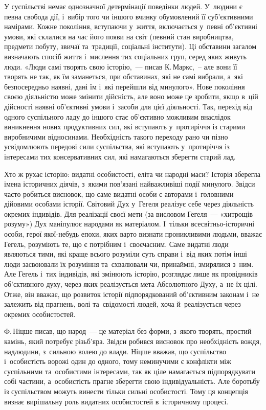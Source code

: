 \documentclass[a5paper,oneside,DIV=12,12pt,headings=small]{scrartcl}
\begin{document}
		У суспільстві немає однозначної детермінації поведінки людей. У~людини є певна свобода дії, і~вибір того чи іншого вчинку обумовлений її суб'\-єктивними намірами. Кожне покоління, вступаючи у~життя, включається у~певні об'\-єктивні умови, які склалися на час його появи на світ (певний стан виробництва, предмети побуту, звичаї та~традиції, соціальні інститути). Ці обставини загалом визначають спосіб життя і~мислення тих соціальних груп, серед яких живуть люди. «Люди самі творять свою історію,~— писав К.\,Маркс,~– але вони її творять не так, як їм заманеться, при обставинах, які не самі вибрали, а~які безпосередньо наявні, дані їм і~які перейшли від минулого». Нове покоління своєю діяльністю може змінити дійсність, але воно може це зробити, якщо в~цій дійсності наявні об'\-єктивні умови і~засоби для цієї діяльності. Так, перехід від одного суспільного ладу до іншого стає об'\-єктивно можливим внаслідок виникнення нових продуктивних сил, які вступають у~протиріччя із старими виробничими відносинами. Необхідність такого переходу рано чи пізно усвідомлюють передові сили суспільства, які вступають у~протиріччя із інтересами тих консервативних сил, які намагаються зберегти старий лад.
		
		Хто ж рухає історію: видатні особистості, еліта чи народні маси? Історія зберегла імена історичних діячів, з~якими пов'язані найважливіші події минулого. Звідси часто робиться висновок, що саме видатні особи є авторами і~головними дійовими особами історії. Світовий Дух у~Гегеля реалізує себе через діяльність окремих індивідів. Для реалізації своєї мети (за висловом Гегеля~— «хитрощів розуму») Дух маніпулює народами як матеріалом. І~тільки всесвітньо-історичні особи, герої якої-небудь епохи, яких варто визнати проникливими людьми, вважає Гегель, розуміють те, що є потрібним і~своєчасним. Саме видатні люди являються тими, які краще всього розуміли суть справи і~від яких потім інші люди засвоювали їх розуміння та~схвалювали чи, принаймні, змирялися з~ним. Але Гегель і~тих індивідів, які змінюють історію, розглядає лише як провідників об'\-єктивного духу, через яких реалізується мета Абсолютного Духу, а~не їх цілі. Отже, він вважає, що розвиток історії підпорядкований об'\-єктивним законам і~не залежить від прагнень, волі та~свідомості людей, хоча й~реалізується через окремих особистостей.
		
		Ф.\,Ніцше писав, що народ~— це матеріал без форми, з~якого творять, простий камінь, який потребує різьб'яра. Звідси робився висновок про необхідність вождя, надлюдини, з~сильною волею до влади. Ніцше вважав, що суспільство і~особистість ворожі один до одного, тому неминучими є  конфлікти між суспільними та~особистими інтересами, так як ціле намагається підпорядкувати собі частини, а~особистість прагне зберегти свою індивідуальність. Але боротьбу із суспільством можуть винести тільки сильні особистості. Тому ця концепція визнає вирішальну роль видатних особистостей в~історичному процесі. 
		
\end{document}
